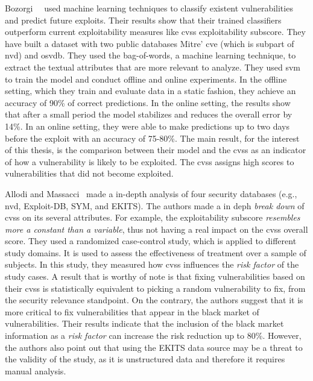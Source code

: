 Bozorgi~\etal{}~\cite{Bozorgi:2010} used machine learning techniques to classify existent vulnerabilities and predict future exploits.
Their results show that their trained classifiers outperform current exploitability measures like \gls{cvss} exploitability subscore.
They have built a dataset with two public databases Mitre' \gls{cve} (which is subpart of \gls{nvd}) and \gls{osvdb}.
They used the bag-of-words, a machine learning technique, to extract the textual attributes that are more relevant to analyze.
They used \gls{svm} to train the model and conduct offline and online experiments.
In the offline setting, which they train and evaluate data in a static fashion, they achieve an accuracy of 90\% of correct predictions.
In the online setting, the results show that after a small period the model stabilizes and reduces the overall error by 14\%.
In an online setting, they were able to make predictions up to two days before the exploit with an accuracy of 75-80\%.
The main result, for the interest of this thesis, is the comparison between their model and the \gls{cvss} as an indicator of how a vulnerability is likely to be exploited.
The \gls{cvss} assigns high scores to vulnerabilities that did not become exploited. 


Allodi and Massacci~\cite{Allodi:2014} made a in-depth analysis of four security databases (e.g., \gls{nvd}, Exploit-DB, SYM, and EKITS). 
The authors made a in deph \emph{break down} of \gls{cvss} on its several attributes.
For example, the exploitability subscore \emph{resembles more a constant than a variable}, thus not having a real impact on the \gls{cvss} overall score.
They used a randomized case-control study, which is applied to different study domains.
It is used to assess the effectiveness of treatment over a sample of subjects.
In this study, they measured how \gls{cvss} influences the \emph{risk factor} of the study cases.
A result that is worthy of note is that fixing vulnerabilities based on their \gls{cvss} is statistically equivalent to picking a random vulnerability to fix, from the security relevance standpoint.
On the contrary, the authors suggest that it is more critical to fix vulnerabilities that appear in the black market of vulnerabilities.
Their results indicate that the inclusion of the black market information as a \emph{risk factor} can increase the risk reduction up to 80\%.
However, the authors also point out that using the EKITS data source may be a threat to the validity of the study, as it is unstructured data and therefore it requires manual analysis.

